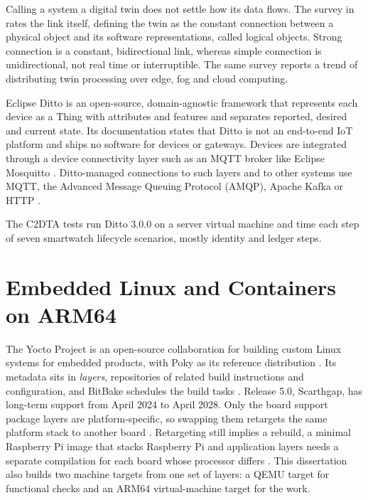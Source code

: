 \noindent Calling a system a digital twin does not settle how its data flows. The survey in \cite{word04} rates the link itself, defining the twin as the constant connection between a physical object and its software representations, called logical objects. Strong connection is a constant, bidirectional link, whereas simple connection is unidirectional, not real time or interruptible\cite{word04}. The same survey reports a trend of distributing twin processing over edge, fog and cloud computing\cite{word04}.

Eclipse Ditto is an open-source, domain-agnostic framework that represents each device as a Thing with attributes and features and separates reported, desired and current state\cite{word10}. Its documentation states that Ditto is not an end-to-end IoT platform and ships no software for devices or gateways\cite{word10}. Devices are integrated through a device connectivity layer such as an MQTT broker like Eclipse Mosquitto \cite{word10}. Ditto-managed connections to such layers and to other systems use MQTT, the Advanced Message Queuing Protocol (AMQP), Apache Kafka or HTTP \cite{word10}.

The C2DTA tests run Ditto 3.0.0 on a server virtual machine and time each step of seven smartwatch lifecycle scenarios, mostly identity and ledger steps\cite{word06}.

\section{Embedded Linux and Containers on ARM64}\label{embedded-linux-and-containers-on-arm64}

\noindent The Yocto Project is an open-source collaboration for building custom Linux systems for embedded products, with Poky as its reference distribution \cite{word11}. Its metadata sits in \emph{layers}, repositories of related build instructions and configuration, and BitBake schedules the build tasks \cite{word11}. Release 5.0, Scarthgap, has long-term support from April 2024 to April 2028\cite{word11}. Only the board support package layers are platform-specific, so swapping them retargets the same platform stack to another board \cite{word12}. Retargeting still implies a rebuild, a minimal Raspberry Pi image that stacks Raspberry Pi and application layers needs a separate compilation for each board whose processor differs \cite{word13}. This dissertation also builds two machine targets from one set of layers: a QEMU target for functional checks and an ARM64 virtual-machine target for the work.

